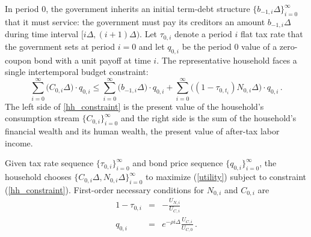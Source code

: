 \documentclass[12pt]{article}
\newcommand{\WJ}[1]{{\textcolor{red}{#1}}}
\begin{document}
{In  period $0$, the  government inherits an initial term-debt structure {$\{b_{-1, i}{\Delta}\}_{i=0}^\infty$} that it must service: %
	the government must pay its creditors   an amount  $b_{-1, i}\Delta$  during time interval $[i\Delta, {(i+1)}\Delta)$}. %
Let $\tau_{0, i}$ denote a period $i$ flat tax rate that the government sets at period $i=0$ and  let $q_{0, i}$ be the period $0$ value of a zero-coupon bond with a unit payoff at time  $i$. 
The representative household faces a single intertemporal budget constraint:
\begin{equation} \label{hh_constraint}
	\sum_{i=0}^\infty \big( C_{0, i}\Delta \big) \cdot q_{0, i} \leq \sum_{i=0}^\infty \big( b_{-1, i} \Delta \big) \cdot q_{0, i}  + \sum_{i=0}^\infty\big( (1-\tau_{0, t_i})N_{0, i}  \Delta \big) \cdot q_{0, i}  \,.
\end{equation}
The left side of \eqref{hh_constraint} is the present value of the household's consumption stream $\{C_{0, i}\}_{i=0}^\infty$ and the right side is the sum of the household's financial wealth and its human wealth, the present value of after-tax labor income.

Given  tax rate sequence $\{\tau_{0, i}\}_{i=0}^\infty$ and bond price sequence $\{q_{0, i}\}_{i=0}^\infty$, the household chooses $\{C_{0, i}\Delta, N_{0, i}\Delta\}_{i=0}^\infty$ to maximize (\ref{utility}) subject to constraint (\ref{hh_constraint}). First-order necessary conditions for $N_{0,i}$ and $C_{0,i}$ are
\begin{eqnarray}
	1-\tau_{0, i} & = &  - \frac{U_{N, i}}{U_{C, i}}  \label{hhfoc1}  \\
	q_{0, i} & = & e^{-\rho i \Delta} \frac{U_{C, i}}{U_{C, 0}} \,.  \label{hhfoc2}
\end{eqnarray}
\end{document}
